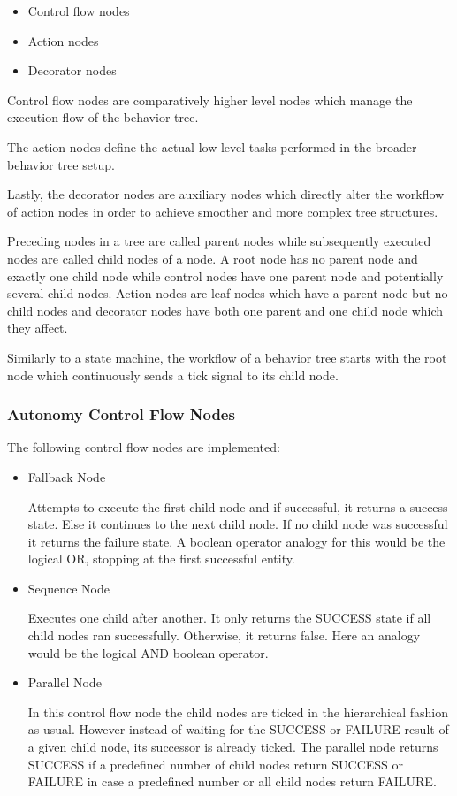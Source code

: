 \begin{itemize}
    \item Control flow nodes
    \item Action nodes
    \item Decorator nodes
    \end{itemize}
    
    Control flow nodes are comparatively higher level nodes which manage the execution flow of the behavior tree.
    
    The action nodes define the actual low level tasks performed in the broader behavior tree setup. 
    
    Lastly, the decorator nodes are auxiliary nodes which directly alter the workflow of action nodes in order to achieve smoother and more complex tree structures.
    
    Preceding nodes in a tree are called parent nodes while subsequently executed nodes are called child nodes of a node. A root node has no parent node and exactly one child node while control nodes have one parent node and potentially several child nodes. Action nodes are leaf nodes which have a parent node but no child nodes and decorator nodes have both one parent and one child node which they affect.

    Similarly to a state machine, the workflow of a behavior tree starts with the root node which continuously sends a tick signal to its child node. 

    

\subsubsection{Autonomy Control Flow Nodes}

The following control flow nodes are implemented:

\begin{itemize}
    \item Fallback Node
    
    Attempts to execute the first child node and if successful, it returns a success state. Else it continues to the next child node. If no child node was successful it returns the failure state. A boolean operator analogy for this would be the logical OR, stopping at the first successful entity.
    \item Sequence Node
    
    Executes one child after another. It only returns the SUCCESS state if all child nodes ran successfully. Otherwise, it returns false. Here an analogy would be the logical AND boolean operator.

    \item Parallel Node
    
    In this control flow node the child nodes are ticked in the hierarchical fashion as usual. However instead of waiting for the SUCCESS or FAILURE result of a given child node, its successor is already ticked. The parallel node returns SUCCESS if a predefined number of child nodes return SUCCESS or FAILURE in case a predefined number or all child nodes return FAILURE.
\end{itemize}

